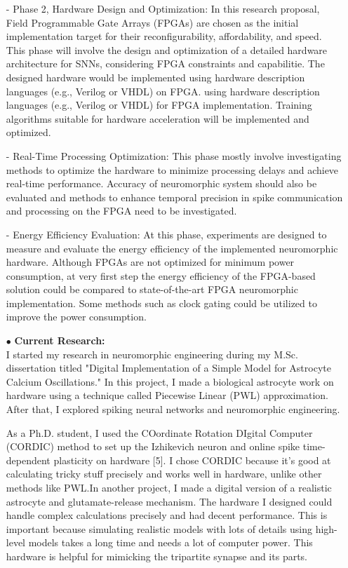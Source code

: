 \begin {itemize}
\begin{itemize}
\item[-] Phase 2, Hardware Design and Optimization:  In this research proposal, Field Programmable Gate Arrays (FPGAs) are chosen as the initial implementation target for their reconfigurability, affordability, and speed.
This phase will involve the design and optimization of a detailed hardware architecture  for SNNs, considering FPGA constraints and capabilitie. The designed hardware would be implemented  using hardware description languages (e.g., Verilog or VHDL) on FPGA. 
          using hardware description languages (e.g., Verilog or VHDL) for FPGA implementation. Training algorithms suitable for hardware acceleration will be implemented and optimized.
          \item [-]  Real-Time Processing Optimization: This phase mostly involve investigating methods to optimize the hardware to minimize processing delays and achieve real-time performance. Accuracy of neuromorphic system should also be evaluated and  methods to enhance temporal precision in spike communication and processing on the FPGA need to be investigated. 
           \item [-] Energy Efficiency Evaluation: At this phase, experiments are designed  to measure and evaluate the energy efficiency of the implemented neuromorphic hardware. Although FPGAs are not optimized for minimum power consumption,  at very first step the energy efficiency of the FPGA-based solution could be compared to state-of-the-art FPGA neuromorphic implementation. Some methods such as clock gating could be utilized to improve the power consumption. 
            \item [$\bullet$] { \bf Current Research:} \vspace{0.5em} \\
I started my research in neuromorphic engineering during my M.Sc. dissertation titled "Digital Implementation of a Simple Model for Astrocyte Calcium Oscillations." In this project, I made a biological astrocyte work on hardware using a technique called Piecewise Linear (PWL) approximation. After that, I explored spiking neural networks and neuromorphic engineering.

As a Ph.D. student, I used the COordinate Rotation DIgital Computer (CORDIC) method to set up the Izhikevich neuron and online spike time-dependent plasticity on hardware [5]. I chose CORDIC because it's good at calculating tricky stuff precisely and works well in hardware, unlike other methods like PWL.In another project, I made a digital version of a realistic astrocyte and glutamate-release mechanism. The hardware I designed could handle complex calculations precisely and had decent performance. This is important because simulating realistic models with lots of details using high-level models takes a long time and needs a lot of computer power. This hardware is helpful for mimicking the tripartite synapse and its parts.
           

\end{itemize}
\end{itemize}
